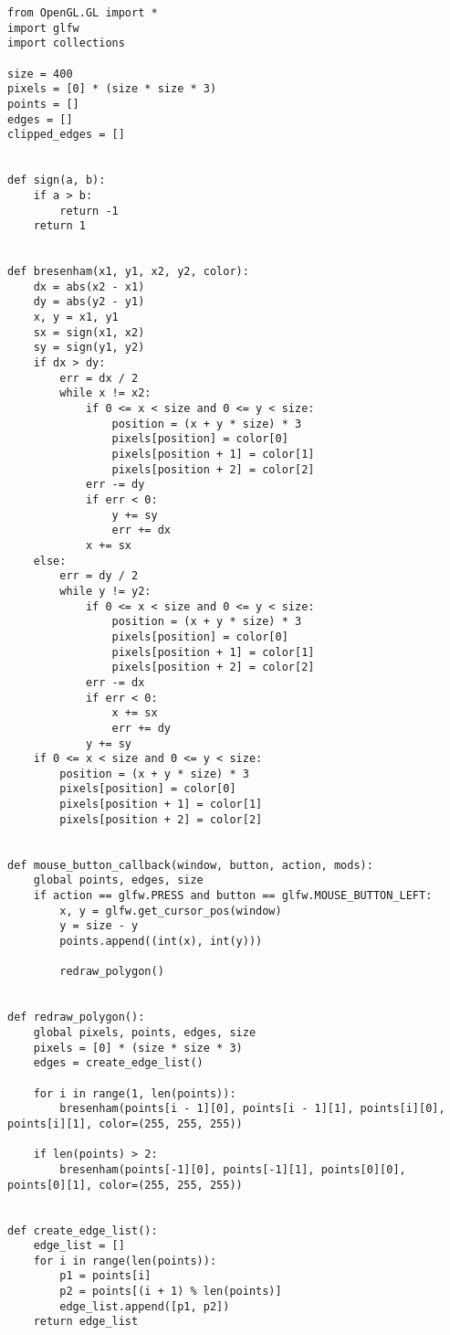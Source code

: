 \documentclass[a4paper, 14pt]{extarticle}
\begin{document}
\begin{lstlisting}
from OpenGL.GL import *
import glfw
import collections

size = 400
pixels = [0] * (size * size * 3)
points = []
edges = []
clipped_edges = []


def sign(a, b):
    if a > b:
        return -1
    return 1


def bresenham(x1, y1, x2, y2, color):
    dx = abs(x2 - x1)
    dy = abs(y2 - y1)
    x, y = x1, y1
    sx = sign(x1, x2)
    sy = sign(y1, y2)
    if dx > dy:
        err = dx / 2
        while x != x2:
            if 0 <= x < size and 0 <= y < size:
                position = (x + y * size) * 3
                pixels[position] = color[0]
                pixels[position + 1] = color[1]
                pixels[position + 2] = color[2]
            err -= dy
            if err < 0:
                y += sy
                err += dx
            x += sx
    else:
        err = dy / 2
        while y != y2:
            if 0 <= x < size and 0 <= y < size:
                position = (x + y * size) * 3
                pixels[position] = color[0]
                pixels[position + 1] = color[1]
                pixels[position + 2] = color[2]
            err -= dx
            if err < 0:
                x += sx
                err += dy
            y += sy
    if 0 <= x < size and 0 <= y < size:
        position = (x + y * size) * 3
        pixels[position] = color[0]
        pixels[position + 1] = color[1]
        pixels[position + 2] = color[2]


def mouse_button_callback(window, button, action, mods):
    global points, edges, size
    if action == glfw.PRESS and button == glfw.MOUSE_BUTTON_LEFT:
        x, y = glfw.get_cursor_pos(window)
        y = size - y
        points.append((int(x), int(y)))

        redraw_polygon()


def redraw_polygon():
    global pixels, points, edges, size
    pixels = [0] * (size * size * 3)
    edges = create_edge_list()

    for i in range(1, len(points)):
        bresenham(points[i - 1][0], points[i - 1][1], points[i][0], points[i][1], color=(255, 255, 255))

    if len(points) > 2:
        bresenham(points[-1][0], points[-1][1], points[0][0], points[0][1], color=(255, 255, 255))


def create_edge_list():
    edge_list = []
    for i in range(len(points)):
        p1 = points[i]
        p2 = points[(i + 1) % len(points)]
        edge_list.append([p1, p2])
    return edge_list



\end{lstlisting}
\end{document}
